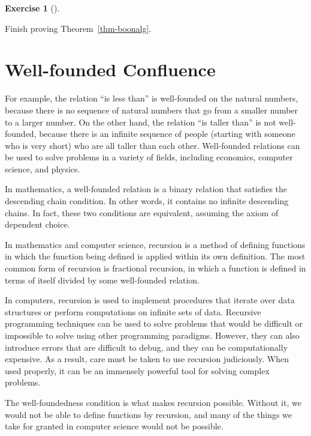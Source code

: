 \documentclass[
  letterpaper,
  10pt,
  reqno,
  twopage,
  openany]{book}
\theoremstyle{plain}
\theoremstyle{definition}
\newtheorem{exercise}{Exercise}[chapter]
\theoremstyle{definition}
\theoremstyle{definition}
\theoremstyle{plain}
\theoremstyle{plain}
\theoremstyle{remark}
\begin{document}
\leavevmode{}%
\begin{exercise}[]\label{exr-boonalg}

Finish proving Theorem~\ref{thm-boonalg}.

\end{exercise}


\hypertarget{well-founded-confluence}{%
\chapter{Well-founded Confluence}\label{well-founded-confluence}}

For example, the relation ``is less than'' is well-founded on the
natural numbers, because there is no sequence of natural numbers that go
from a smaller number to a larger number. On the other hand, the
relation ``is taller than'' is not well-founded, because there is an
infinite sequence of people (starting with someone who is very short)
who are all taller than each other. Well-founded relations can be used
to solve problems in a variety of fields, including economics, computer
science, and physics.

In mathematics, a well-founded relation is a binary relation that
satisfies the descending chain condition. In other words, it contains no
infinite descending chains. In fact, these two conditions are
equivalent, assuming the axiom of dependent choice.

In mathematics and computer science, recursion is a method of defining
functions in which the function being defined is applied within its own
definition. The most common form of recursion is fractional recursion,
in which a function is defined in terms of itself divided by some
well-founded relation.

In computers, recursion is used to implement procedures that iterate
over data structures or perform computations on infinite sets of data.
Recursive programming techniques can be used to solve problems that
would be difficult or impossible to solve using other programming
paradigms. However, they can also introduce errors that are difficult to
debug, and they can be computationally expensive. As a result, care must
be taken to use recursion judiciously. When used properly, it can be an
immensely powerful tool for solving complex problems.

The well-foundedness condition is what makes recursion possible. Without
it, we would not be able to define functions by recursion, and many of
the things we take for granted in computer science would not be
possible.
\end{document}
